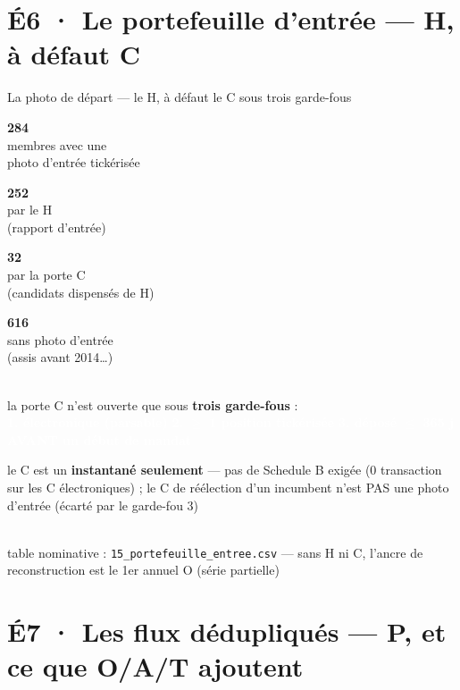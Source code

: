 \documentclass[11pt,aspectratio=169]{beamer}
\newcommand{\co}[1]{\texttt{#1}}
\newcommand{\tuile}[3]{%
  \begin{minipage}[t]{0.23\textwidth}\centering
    \colorbox{#1}{\parbox[c][21mm][c]{\dimexpr\linewidth-8pt}{\centering
      {\color{white}\Large\textbf{#2}}\\[0.6mm]
      {\color{white}\footnotesize #3}}}
  \end{minipage}}
\newcommand{\badge}[2]{\colorbox{#1}{\textcolor{white}{\footnotesize\textbf{#2}}}}
\begin{document}
\section{É6 · Le portefeuille d'entrée — H, à défaut C}


\begin{frame}{La photo de départ — le H, à défaut le C sous trois garde-fous}
  \centering
  \tuile{helec}{284}{membres avec une\\photo d'entrée tickérisée}\hfill
  \tuile{okgreen}{252}{par le H\\(rapport d'entrée)}\hfill
  \tuile{dataC}{32}{par la porte C\\(candidats dispensés de H)}\hfill
  \tuile{grisC}{616}{sans photo d'entrée\\(assis avant 2014…)}\\[4mm]
  {\footnotesize la porte C n'est ouverte que sous \textbf{trois garde-fous} :}\\[1mm]
  {\footnotesize \badge{helec}{1. électronique (parsable)}\;
   \badge{helec}{2. $\geq$ 1 position tickérisée}\;
   \badge{helec}{3. déposé $\leq$ 365 j AVANT un début de mandat}}\\[2.5mm]
  \colorbox{alertred}{\parbox{0.9\textwidth}{\footnotesize\color{white}\centering
    le C est un \textbf{instantané seulement} — pas de Schedule B exigée
    (0 transaction sur les C électroniques) ; le C de réélection d'un incumbent
    n'est PAS une photo d'entrée (écarté par le garde-fou 3)}}\\[1.5mm]
  {\scriptsize\color{black!60} table nominative : \co{15\_portefeuille\_entree.csv} —
   sans H ni C, l'ancre de reconstruction est le 1er annuel O (série partielle)}
\end{frame}


\section{É7 · Les flux dédupliqués — P, et ce que O/A/T ajoutent}
\end{document}
